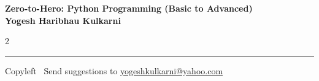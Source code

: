 \documentclass[8pt,landscape]{article}
\begin{document}
\footnotesize


\begin{center}
\Large{\textbf{Zero-to-Hero: Python Programming (Basic to Advanced)\\ Yogesh Haribhau Kulkarni}}
\end{center}

\begin{multicols}{2}
	
\end{multicols}

\rule{\linewidth}{0.25pt}
\scriptsize
Copyleft \textcopyleft\  Send suggestions to
\href{http://www.yogeshkulkarni.com}{yogeshkulkarni@yahoo.com}
\end{document}
